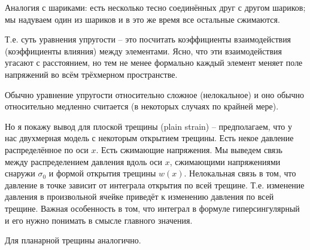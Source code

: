 \documentclass[main.tex]{subfiles}
\begin{document}
Аналогия с шариками: есть несколько тесно соединённых друг с другом шариков; мы надуваем один из шариков и в это же время все остальные сжимаются.

Т.е. суть уравнения упругости -- это посчитать коэффициенты взаимодействия (коэффициенты влияния) между элементами.
Ясно, что эти взаимодействия угасают с расстоянием, но тем не менее формально каждый элемент меняет поле напряжений во всём трёхмерном пространстве.

Обычно уравнение упругости относительно сложное (нелокальное) и оно обычно относительно медленно считается (в некоторых случаях по крайней мере).

Но я покажу вывод для плоской трещины (plain strain) -- предполагаем, что у нас двухмерная модель с некоторым открытием трещины.
Есть некое давление распределённое по оси $x$.
Есть сжимающие напряжения.
Мы выведем связь между распределением давления вдоль оси $x$, сжимающими напряжениями снаружи $\sigma_0$ и формой открытия трещины $w(x)$.
Нелокальная связь в том, что давление в точке зависит от интеграла открытия по всей трещине.
Т.е. изменение давления в произвольной ячейке приведёт к изменению давления по всей трещине.
Важная особенность в том, что интеграл в формуле гиперсингулярный и его нужно понимать в смысле главного значения.

Для планарной трещины аналогично.
\end{document}
